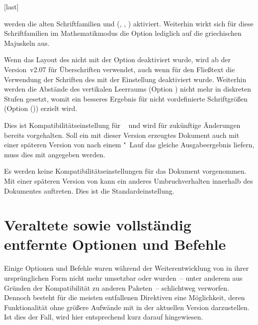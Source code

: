 \begin{Declaration}[v2.03]{}[last]
\begin{values}{}
  werden die alten Schriftfamilien \Univers und \DIN 
  (, , )
  aktiviert. Weiterhin wirkt sich für diese Schriftfamilien im Mathematikmodus 
  die Option  lediglich auf die griechischen 
  Majuskeln aus.
\item[\PValue{2.06}]
  Wenn das Layout des \CDs nicht mit der Option  deaktiviert 
  wurde, wird ab der Version~v2.07 für Überschriften \OpenSans verwendet, auch 
  wenn für den Fließtext die Verwendung der Schriften des \CDs mit der 
  Einstellung  deaktiviert wurde. Weiterhin werden die 
  Abstände des vertikalen Leerraums (Option ) nicht 
  mehr in diskreten Stufen gesetzt, womit ein besseres Ergebnis für nicht 
  vordefinierte Schriftgrößen (Option ()) 
  erzielt wird.
\item[\PValue{2.07}]
  Dies ist Kompatibilitätseinstellung für \TUDScript~\vTUDScript{} und wird für 
  zukünftige Änderungen bereits vorgehalten. Soll ein mit dieser Version 
  erzeugtes Dokument auch mit einer späteren Version von \TUDScript nach einem 
  "~Lauf das gleiche Ausgabeergebnis liefern, muss dies mit 
   angegeben werden.
\item[\PValue{last}]
  Es werden keine Kompatibilitätseinstellungen für das Dokument vorgenommen. 
  Mit einer späteren Version von \TUDScript kann ein anderes Umbruchverhalten 
  innerhalb des Dokumentes auftreten. Dies ist die Standardeinstellung.
\end{values}
\end{Declaration}



\section{%
  Veraltete sowie vollständig entfernte Optionen und Befehle%
}
Einige Optionen und Befehle waren während der Weiterentwicklung von \TUDScript
in ihrer ursprünglichen Form nicht mehr umsetzbar oder wurden~-- unter anderem 
aus Gründen der Kompatibilität zu anderen Paketen~-- schlichtweg verworfen. 
Dennoch besteht für die meisten entfallenen Direktiven eine Möglichkeit, deren 
Funktionalität ohne größere Aufwände mit \TUDScript in der aktuellen Version 
\vTUDScript{} darzustellen. Ist dies der Fall, wird hier entsprechend kurz 
darauf hingewiesen.


